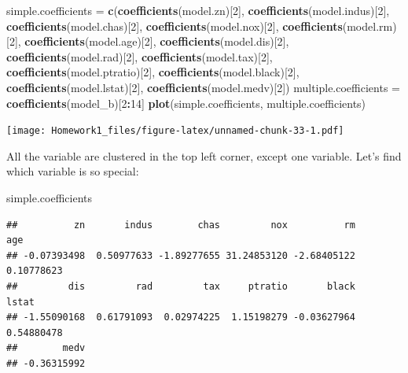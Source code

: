 \documentclass[]{article}
\newenvironment{Shaded}{\begin{snugshade}}{\end{snugshade}}
\newcommand{\KeywordTok}[1]{\textcolor[rgb]{0.13,0.29,0.53}{\textbf{#1}}}
\newcommand{\DecValTok}[1]{\textcolor[rgb]{0.00,0.00,0.81}{#1}}
\newcommand{\StringTok}[1]{\textcolor[rgb]{0.31,0.60,0.02}{#1}}
\newcommand{\OperatorTok}[1]{\textcolor[rgb]{0.81,0.36,0.00}{\textbf{#1}}}
\newcommand{\NormalTok}[1]{#1}
\begin{document}
\begin{Shaded}
\begin{Highlighting}[]
\NormalTok{simple.coefficients =}\StringTok{ }\KeywordTok{c}\NormalTok{(}\KeywordTok{coefficients}\NormalTok{(model.zn)[}\DecValTok{2}\NormalTok{], }\KeywordTok{coefficients}\NormalTok{(model.indus)[}\DecValTok{2}\NormalTok{],}
                        \KeywordTok{coefficients}\NormalTok{(model.chas)[}\DecValTok{2}\NormalTok{], }\KeywordTok{coefficients}\NormalTok{(model.nox)[}\DecValTok{2}\NormalTok{],}
                        \KeywordTok{coefficients}\NormalTok{(model.rm)[}\DecValTok{2}\NormalTok{], }\KeywordTok{coefficients}\NormalTok{(model.age)[}\DecValTok{2}\NormalTok{],}
                        \KeywordTok{coefficients}\NormalTok{(model.dis)[}\DecValTok{2}\NormalTok{], }\KeywordTok{coefficients}\NormalTok{(model.rad)[}\DecValTok{2}\NormalTok{],}
                        \KeywordTok{coefficients}\NormalTok{(model.tax)[}\DecValTok{2}\NormalTok{], }\KeywordTok{coefficients}\NormalTok{(model.ptratio)[}\DecValTok{2}\NormalTok{],}
                        \KeywordTok{coefficients}\NormalTok{(model.black)[}\DecValTok{2}\NormalTok{], }\KeywordTok{coefficients}\NormalTok{(model.lstat)[}\DecValTok{2}\NormalTok{],}
                        \KeywordTok{coefficients}\NormalTok{(model.medv)[}\DecValTok{2}\NormalTok{])}
\NormalTok{multiple.coefficients =}\StringTok{ }\KeywordTok{coefficients}\NormalTok{(model_b)[}\DecValTok{2}\OperatorTok{:}\DecValTok{14}\NormalTok{]}
\KeywordTok{plot}\NormalTok{(simple.coefficients, multiple.coefficients)}
\end{Highlighting}
\end{Shaded}

\texttt{[image: Homework1\_files/figure-latex/unnamed-chunk-33-1.pdf]}

All the variable are clustered in the top left corner, except one
variable. Let's find which variable is so special:

\begin{Shaded}
\begin{Highlighting}[]
\NormalTok{simple.coefficients}
\end{Highlighting}
\end{Shaded}

\begin{verbatim}
##          zn       indus        chas         nox          rm         age 
## -0.07393498  0.50977633 -1.89277655 31.24853120 -2.68405122  0.10778623 
##         dis         rad         tax     ptratio       black       lstat 
## -1.55090168  0.61791093  0.02974225  1.15198279 -0.03627964  0.54880478 
##        medv 
## -0.36315992
\end{verbatim}
\end{document}
